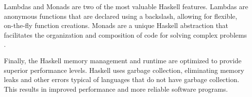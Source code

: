 \documentclass[a4paper, titlepage, twoside]{article}
\begin{document}
Lambdas and Monads are two of the most valuable Haskell features. Lambdas are anonymous functions that are declared using a backslash, allowing for flexible, on-the-fly function creations. Monads are a unique Haskell abstraction that facilitates the organization and composition of code for solving complex problems \autocite{marlowParallelConcurrentProgramming2013}.

Finally, the Haskell memory management and runtime are optimized to provide superior performance levels. Haskell uses garbage collection, eliminating memory leaks and other errors typical of languages that do not have garbage collection. This results in improved performance and more reliable software programs.

\printbibliography
\end{document}
